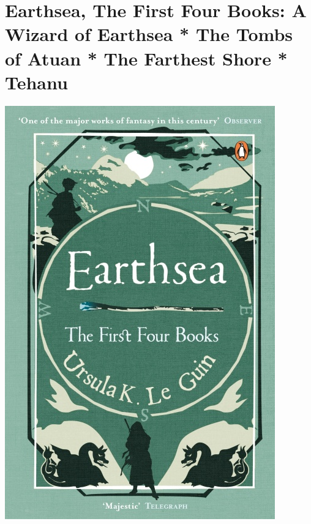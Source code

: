 \documentclass{tufte-handout}
\makeatletter
\newcommand{\varcaption}[2][0pt]{%
  \gsetlength{\@tufte@caption@vertical@offset}{-#1}%
  \gdef\@tufte@stored@varcaption{#2}%
}
\gdef\@tufte@stored@varcaption{} %
\makeatother
\begin{document}
\section*{Earthsea, The First Four Books: A Wizard of Earthsea * The Tombs of Atuan * The Farthest Shore * Tehanu}
\begin{marginfigure}[12\baselineskip]
   \includegraphics[width=\linewidth]{images/earthsea.jpg}
   \varcaption{\href{https://www.penguin.co.uk/books/149/14981/earthsea/9780241956878.html}{Publisher Link}, \href{https://www.amazon.com/Earthsea-Quartet-Ursula-Guin/dp/0241956870/}{Amazon Link}}
\end{marginfigure}
\end{document}
